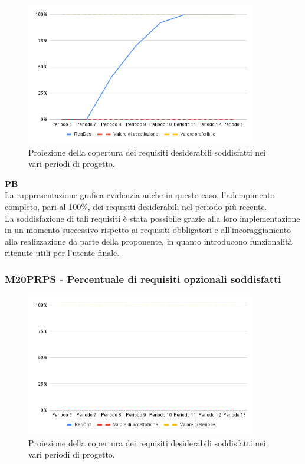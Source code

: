 \vspace{0.3cm}

\begin{figure}[H]
    \centering
    \includegraphics[width=0.9\textwidth]{../Images/PianoDiQualifica/PRDS.png}
    \caption{Proiezione della copertura dei requisiti desiderabili soddisfatti nei vari periodi di progetto.}
    \label{fig:11}
\end{figure}

\vspace{0.2cm}

\textbf{PB} \\
La rappresentazione grafica evidenzia anche in questo caso, l'adempimento completo, pari al 100\%, dei requisiti desiderabili nel periodo più recente. \\
La soddisfazione di tali requisiti è stata possibile grazie alla loro implementazione in un momento successivo rispetto ai requisiti obbligatori e all’incoraggiamento alla realizzazione da parte della proponente, in quanto introducono funzionalità ritenute utili per l’utente finale.

\subsubsection{M20PRPS - Percentuale di requisiti opzionali soddisfatti}

\vspace{0.3cm}
\begin{figure}[H]
    \centering
    \includegraphics[width=0.9\textwidth]{../Images/PianoDiQualifica/PRPS.png}
    \caption{Proiezione della copertura dei requisiti desiderabili soddisfatti nei vari periodi di progetto.}
    \label{fig:12}
\end{figure}

